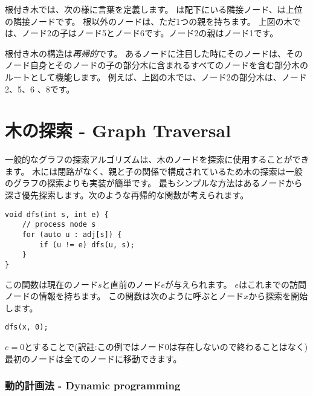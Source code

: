 根付き木では、次の様に言葉を定義します。
は配下にいる隣接ノード、は上位の隣接ノードです。
根以外のノードは、ただ1つの親を持ちます。
上図の木では、ノード2の子はノード5とノード6です。ノード2の親はノード1です。


根付き木の構造は\emph{再帰的}です。
あるノードに注目した時にそのノードは、そのノード自身とそのノードの子の部分木に含まれるすべてのノードを含む部分木のルートとして機能します。
例えば、上図の木では、ノード2の部分木は、ノード2、5、6 、8です。

\begin{center}
\end{center}

\section{木の探索 - Graph Traversal}

一般的なグラフの探索アルゴリズムは、木のノードを探索に使用することができます。
木には閉路がなく、親と子の関係で構成されているため木の探索は一般のグラフの探索よりも実装が簡単です。
最もシンプルな方法はあるノードから深さ優先探索します。次のような再帰的な関数が考えられます。

\begin{lstlisting}
void dfs(int s, int e) {
    // process node s
    for (auto u : adj[s]) {
        if (u != e) dfs(u, s);
    }
}
\end{lstlisting}

この関数は現在のノード$s$と直前のノード$e$が与えられます。
$e$はこれまでの訪問ノードの情報を持ちます。
この関数は次のように呼ぶとノード$x$から探索を開始します。

\begin{lstlisting}
dfs(x, 0);
\end{lstlisting}

$e=0$とすることで(訳註:この例ではノード0は存在しないので終わることはなく)最初のノードは全てのノードに移動できます。

\subsubsection{動的計画法 - Dynamic programming}

